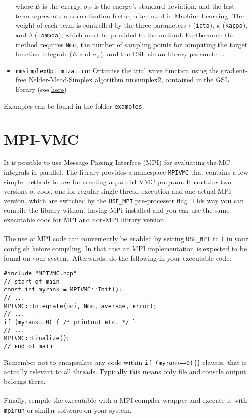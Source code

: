 \documentclass[11pt,a4paper,twoside]{article}
\begin{document}
\begin{itemize}
$$  $$
  where $E$ is the energy, $\sigma_E$ is the energy's standard deviation, and the last term represents a normalization factor, often used in Machine Learning. The weight of each term is controlled by the three parameters $\iota$ (\verb+iota+), $\kappa$ (\verb+kappa+), and $\lambda$ (\verb+lambda+), which must be provided to the method. Furthermore the method requires \verb+Nmc+, the number of sampling points for computing the target function integrals ($E$ and $\sigma_E$), and the GSL siman library parameters.
\item \verb+nmsimplexOptimization+: Optimise the trial wave function using the gradient-free Nelder-Mead-Simplex algorithm nmsimplex2, contained in the GSL library (see \href{https://www.gnu.org/software/gsl/doc/html/siman.html}{here}).
  
\end{itemize}

Examples can be found in the folder \verb+examples+.


\section{MPI-VMC} %
\label{sec:mpivmc}

It is possible to use Message Passing Interface (MPI) for evaluating the MC integrals
in parallel. The library provides a namespace \verb+MPIVMC+ that contains a few
simple methods to use for creating a parallel VMC program. It contains two
versions of code, one for regular single thread execution and one actual MPI
version, which are switched by the \verb+USE_MPI+ pre-processor flag. This way
you can compile the library without having MPI installed and you can use the same
executable code for MPI and non-MPI library version.
\\\\The use of MPI code can conveniently be enabled by setting \verb+USE_MPI+ to $1$ in your
config.sh before compiling. In that case an MPI implementation is expected to be
found on your system. Afterwards, do the following in your executable code:

\begin{lstlisting}
#include "MPIVMC.hpp"
// start of main
const int myrank = MPIVMC::Init();
// ...
MPIVMC::Integrate(mci, Nmc, average, error);
// ...
if (myrank==0) { /* printout etc. */ }
// ...
MPIVMC::Finalize();
// end of main
\end{lstlisting}
Remember not to encapsulate any code within \verb+if (myrank==0){}+ clauses,
that is actually relevant to all threads. Typically this means only file and
console output belongs there.
\\\\Finally, compile the executable with a MPI compiler wrapper and execute it with
\verb+mpirun+ or similar software on your system.


\printindex
\end{document}
